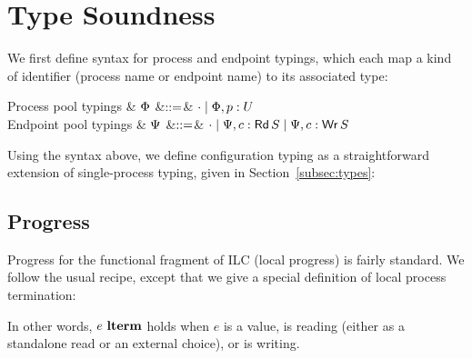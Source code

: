 \section{Type Soundness}
\label{sec:ilcproofs}

We first define syntax for process and endpoint typings, which each map a kind of
identifier (process name or endpoint name) to its associated type:

\begin{grammar}
    Process pool typings
    & $\Phi$
    &$\mathrel{::=}$& $\cdot \mathrel{\mid} \Phi,p: U$
    \\
    Endpoint pool typings
    & $\Psi$
    &$\mathrel{::=}$& $\cdot \mathrel{\mid} \Psi,c:\textnormal{\textsf{Rd}}\,S \mathrel{\mid} \Psi,c:\textnormal{\textsf{Wr}}\,S$
\end{grammar}


Using the syntax above, we define configuration typing as a straightforward
extension of single-process typing, given in
Section~\ref{subsec:types}:\smallskip


\subsection{Progress}
\label{subsec:label}

Progress for the functional fragment of ILC (local progress) is fairly
standard. We follow the usual recipe, except that we give a special definition
of local process termination:\smallskip

In other words, $e~\textbf{lterm}$ holds when $e$ is a value, is reading (either as a
standalone read or an external choice), or is writing.

